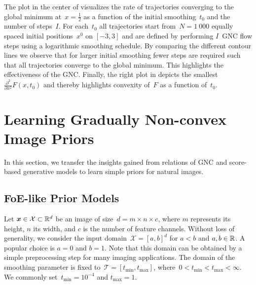 \documentclass{article}
\newcommand{\X}{\mathcal{X}}
\newcommand{\T}{\mathcal{T}}
\newcommand{\tmin}{t_\mathrm{min}}
\newcommand{\tmax}{t_\mathrm{max}}
\theoremstyle{plain}
\theoremstyle{definition}
\theoremstyle{remark}
\begin{document}
The plot in the center of  visualizes the rate of trajectories converging to the global minimum at~$x=\tfrac12$ as a function of the initial smoothing~$t_0$ and the number of steps~$I$.
For each~$t_0$ all trajectories start from~$N=1\ 000$ equally spaced initial positions~$x^0$ on $[-3,3]$ and are defined by performing $I$~GNC flow steps using a logarithmic smoothing schedule.
By comparing the different contour lines we observe that for larger initial smoothing fewer steps are required such that all trajectories converge to the global minimum.
This highlights the effectiveness of the GNC.
Finally, the right plot in  depicts the smallest~$\frac{\partial^2}{\partial x^2}F(x,t_0)$ and thereby highlights convexity of~$F$ as a function of~$t_0$.

\section{Learning Gradually Non-convex Image Priors}
In this section, we transfer the insights gained from relations of GNC and score-based generative models to learn simple priors for natural images.

\subsection{FoE-like Prior Models}
Let $\vx\in\X\subset\R^d$ be an image of size~$d=m\times n\times c$, where $m$ represents its height, $n$ its width, and $c$ is the number of feature channels.
Without loss of generality, we consider the input domain~$\X=[a,b]^d$ for $a<b$ and $a,b\in\mathbb{R}$.
A popular choice is $a=0$ and $b=1$.
Note that this domain can be obtained by a simple preprocessing step for many imaging applications.
The domain of the smoothing parameter is fixed to~$\T=[\tmin,\tmax]$, where~$0<\tmin<\tmax<\infty$.
We commonly set~$\tmin=10^{-4}$ and $\tmax=1$.
\end{document}

